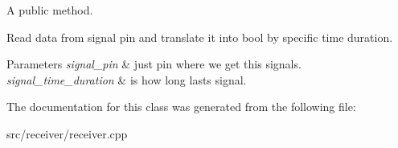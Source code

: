 A public method. 

Read data from signal pin and translate it into bool by specific time duration.


\begin{DoxyParams}{Parameters}
{\em signal\+\_\+pin} & just pin where we get this signals. \\
\hline
{\em signal\+\_\+time\+\_\+duration} & is how long lasts signal. \\
\hline
\end{DoxyParams}


The documentation for this class was generated from the following file\+:\begin{DoxyCompactItemize}
\item 
src/receiver/receiver.\+cpp\end{DoxyCompactItemize}
